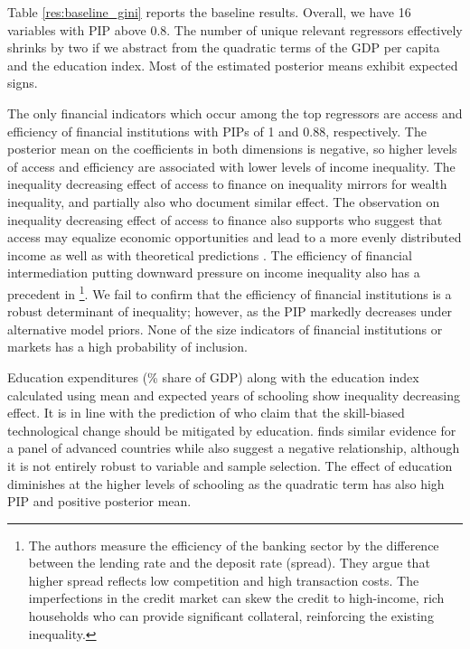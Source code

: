 \documentclass[preprint, nonatbib, 10pt]{elsarticle}
\begin{document}

Table \ref{res:baseline_gini} reports the baseline results. Overall, we have 16 variables with \ac{PIP} above 0.8. The number of unique relevant regressors effectively shrinks by two if we abstract from the quadratic terms of the \ac{GDP} per capita and the education index. Most of the estimated posterior means exhibit expected signs.

The only financial indicators which occur among the top regressors are access and efficiency of financial institutions with \acp{PIP} of 1 and 0.88, respectively. The posterior mean on the coefficients in both dimensions is negative, so higher levels of access and efficiency are associated with lower levels of income inequality. The inequality decreasing effect of access to finance on inequality mirrors \textcite{hasan2020finance} for wealth inequality, and partially also \textcite{furceri2019robust, naceurzhang2016} who document similar effect. The observation on inequality decreasing effect of access to finance also supports \textcite{claessens2007finance} who suggest that access may equalize economic opportunities and lead to a more evenly distributed income as well as with theoretical predictions \parencite{braunetal2019,galormoav2004,banerjeenewman1990}. The efficiency of financial intermediation putting downward pressure on income inequality also has a precedent in \textcite{gimet2011closer}\footnote{The authors measure the efficiency of the banking sector by the difference between the lending rate and the deposit rate (spread). They argue that higher spread reflects low competition and high transaction costs. The imperfections in the credit market can skew the credit to high-income, rich households who can provide significant collateral, reinforcing the existing inequality.}. We fail to confirm that the efficiency of financial institutions is a robust determinant of inequality; however, as the \ac{PIP} markedly decreases under alternative model priors. None of the size indicators of financial institutions or markets has a high probability of inclusion.

Education expenditures (\% share of \ac{GDP}) along with the education index calculated using mean and expected years of schooling show inequality decreasing effect. It is in line with the prediction of \textcite{goldin2009race,deaton2013great} who claim that the skill-biased technological change should be mitigated by education. \textcite{oecd2011divided} finds similar evidence for a panel of advanced countries while \textcite{furceri2019robust} also suggest a negative relationship, although it is not entirely robust to variable and sample selection. The effect of education diminishes at the higher levels of schooling as the quadratic term has also high \ac{PIP} and positive posterior mean. 
\end{document}
